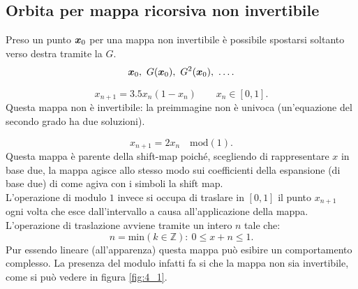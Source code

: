 \subsection{Orbita per mappa ricorsiva non invertibile}%
\label{sub:Orbita per mappa ricorsiva non invertibile}
Preso un punto $\boldsymbol{x}_0$ per una mappa non invertibile è possibile spostarsi soltanto verso destra tramite la $G$.
\[
    \vect{x}_0, \ G(\vect{x}_0), \ G^2(\vect{x}_0), \ \ldots
.\] 
\begin{exmp}
    \[
        x_{n+1} = 3.5 x_n \left(1- x_n\right) \qquad x_n \in \left[0,1\right]
    .\] 
    Questa mappa non è invertibile: la preimmagine non è univoca (un'equazione del secondo grado ha due soluzioni).
\end{exmp}
\noindent
\begin{exmp}
    \[
	x_{n+1}=2x_n \quad \text{mod}(1)
    .\] 
    Questa mappa è parente della shift-map poiché, scegliendo di rappresentare $x$ in base due, la mappa agisce allo stesso modo sui coefficienti della espansione (di base due) di come agiva con i simboli la shift map.
    \\
    L'operazione di modulo $1$ invece si occupa di traslare in $[0,1]$ il punto $x_{n+1}$ ogni volta che esce dall'intervallo a causa all'applicazione della mappa. \\
    L'operazione di traslazione avviene tramite un intero $n$ tale che:
    \[
	n = \text{min}(k \in \mathbb{Z}): \ 0 \le x+n \le 1
    .\] 
    Pur essendo lineare (all'apparenza) questa mappa può esibire un comportamento complesso. La presenza del modulo infatti fa si che la mappa non sia invertibile, come si può vedere in figura \ref{fig:4_1}.
\end{exmp}
\noindent
